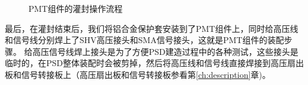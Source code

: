 \begin{figure}[htb]
{}
\caption{PMT组件的灌封操作流程}
\label{fig:construction:potting}
\end{figure}
最后，在灌封结束后，我们将铝合金保护套安装到了PMT组件上，同时给高压线和信号线分别焊上了SHV高压接头和SMA信号接头，这就是PMT组件的装配步骤。
给高压信号线焊上接头是为了方便PSD建造过程中的各种测试，这些接头是临时的，在PSD整体装配时会被剪掉，然后将高压线和信号线直接焊接到高压扇出板和信号转接板上（高压扇出板和信号转接板参看第\ref{ch:description}章)。

